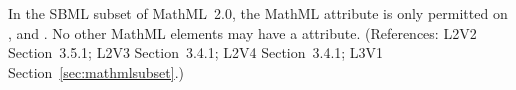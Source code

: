 In the SBML subset of MathML~2.0, the MathML attribute
 is only permitted on ,  and
.  No other MathML elements may have a
 attribute.  (References: L2V2 Section~3.5.1; L2V3
Section~3.4.1; L2V4 Section~3.4.1; L3V1 Section~\ref{sec:mathmlsubset}.)

